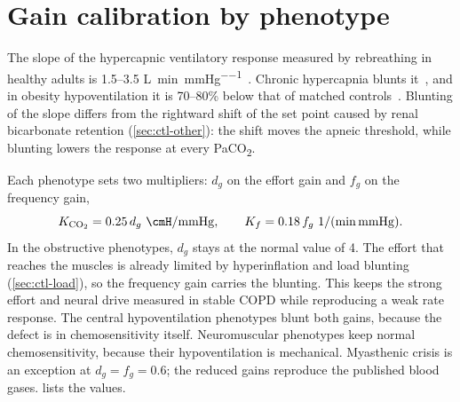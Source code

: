 \section{Gain calibration by phenotype}
\label{sec:ctl-gain}
The slope of the hypercapnic ventilatory response measured by rebreathing in healthy adults is 1.5--3.5 \si{\liter\per\minute\per\mmHg}~\citep{read1967,duffin2011}. Chronic hypercapnia blunts it~\citep{flenley1967,gorini1996}, and in obesity hypoventilation it is 70--80\% below that of matched controls~\citep{lopata1982,piper2011}. Blunting of the slope differs from the rightward shift of the set point caused by renal bicarbonate retention (\cref{sec:ctl-other}): the shift moves the apneic threshold, while blunting lowers the response at every PaCO\textsubscript{2}.

Each phenotype sets two multipliers: $d_g$ on the effort gain and $f_g$ on the frequency gain,
\begin{equation}
K_{\mathrm{CO_2}}=0.25\,d_g~\si{\cmH\per\mmHg},\qquad K_f=0.18\,f_g~\si{\per\minute\per\mmHg}.
\label{eq:ctl-gain}
\end{equation}
In the obstructive phenotypes, $d_g$ stays at the normal value of 4. The effort that reaches the muscles is already limited by hyperinflation and load blunting (\cref{sec:ctl-load}), so the frequency gain carries the blunting. This keeps the strong effort and neural drive measured in stable COPD while reproducing a weak rate response. The central hypoventilation phenotypes blunt both gains, because the defect is in chemosensitivity itself. Neuromuscular phenotypes keep normal chemosensitivity, because their hypoventilation is mechanical. Myasthenic crisis is an exception at $d_g=f_g=0.6$; the reduced gains reproduce the published blood gases.  lists the values.

